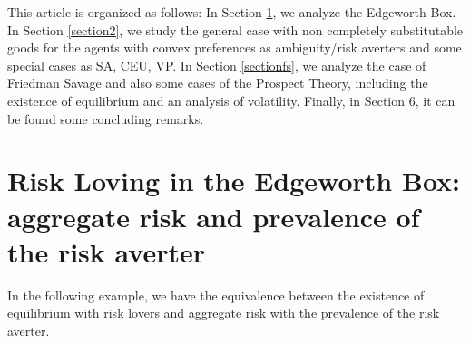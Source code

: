 \documentclass[pdftex]{article}
\numberwithin{equation}{section}
\theoremstyle{th}
\newtheorem{proof lemma}{{Proof Lemma}.}
\theoremstyle{definition}
\newtheorem*{risk lovers}{Risk lovers}
\newtheorem*{risk averse}{Risk averse}
\begin{document}
This article is organized as follows: In Section \ref{section1}, we analyze the Edgeworth Box. In Section \ref{section2}, we study the general case with non completely substitutable goods for the agents with convex preferences as ambiguity/risk averters and some special cases as SA, CEU, VP.
 In Section \ref{sectionfs}, we analyze the case of Friedman Savage and also some cases of the Prospect Theory, including the existence of equilibrium and an analysis of volatility. Finally, in Section 6, it can be found some concluding remarks.

\section{Risk Loving in the Edgeworth Box: aggregate risk and prevalence of the risk averter}\label{section1}
In the following example, we have the equivalence between the existence of equilibrium with risk lovers and aggregate risk with the prevalence of the risk averter.
\end{document}
